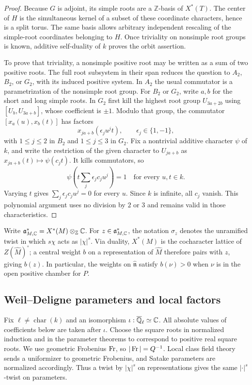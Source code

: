 \begin{proof}
Because $G$ is adjoint, its simple roots are a $\mathbb Z$-basis of
$X^*(T)$. The center of $H$ is the simultaneous kernel of a subset of
these coordinate characters, hence is a split torus. The same basis
allows arbitrary independent rescaling of the simple-root coordinates
belonging to $H$. Once triviality on nonsimple root groups is known,
additive self-duality of $k$ proves the orbit assertion.

To prove that triviality, a nonsimple positive root may be written as a
sum of two positive roots. The full root subsystem in their span reduces
the question to $A_2$, $B_2$, or $G_2$, with its induced positive system.
In $A_2$ the usual commutator is a parametrization of the nonsimple root
group. For $B_2$ or $G_2$, write $a,b$ for the short and long simple roots.
In $G_2$ first kill the highest root group $U_{3a+2b}$ using
$[U_b,U_{3a+b}]$, whose coefficient is $\pm1$. Modulo that group, the
commutator $[x_a(u),x_b(t)]$ has factors
\[
 x_{ja+b}(\epsilon_j u^j t),\qquad \epsilon_j\in\{1,-1\},
\]
with $1\leq j\leq2$ in $B_2$ and $1\leq j\leq3$ in $G_2$.
Fix a nontrivial additive character $\psi$ of $k$, and write the
restriction of the given character to $U_{ja+b}$ as
$x_{ja+b}(t)\mapsto\psi(c_jt)$. It kills commutators, so
\[
 \psi\left(t\sum_j\epsilon_jc_ju^j\right)=1
 \quad\text{for every }u,t\in k.
\]
Varying $t$ gives $\sum_j\epsilon_jc_ju^j=0$ for every $u$.
Since $k$ is infinite, all $c_j$ vanish. This polynomial argument uses no
division by $2$ or $3$ and remains valid in those characteristics.
\end{proof}

Write $\mathfrak a_{M,\mathbb C}^*=X^*(M)\otimes_{\mathbb Z}\mathbb C$.
For $z\in\mathfrak a_{M,\mathbb C}^*$, the notation $\sigma_z$ denotes the
unramified twist in which $s\chi$ acts as $|\chi|^s$.
Via duality, $X^*(M)$ is the cocharacter lattice of
$Z(\widehat M)^\circ$; a central weight $b$ on a representation of
$\widehat M$ therefore pairs with $z$, giving $b(z)$.
In particular, the weights on $\widehat{\mathfrak n}$ satisfy
$b(\nu)>0$ when $\nu$ is in the open positive chamber for $P$.

\subsection{Weil--Deligne parameters and local factors}

Fix $\ell\ne\operatorname{char}(k)$ and an isomorphism
$\iota:\overline{\mathbb Q}_\ell\simeq\mathbb C$. All absolute values of coefficients
below are taken after $\iota$. Choose the square roots in normalized
induction and in the parameter theorems to correspond to positive real
square roots. We use geometric Frobenius $\operatorname{Fr}$, so $|\operatorname{Fr}|=Q^{-1}$.
Local class field theory sends a uniformizer to geometric Frobenius,
and Satake parameters are normalized accordingly. Thus a twist by
$|\chi|^s$ on representations gives the same $|\cdot|^s$-twist on
parameters.

